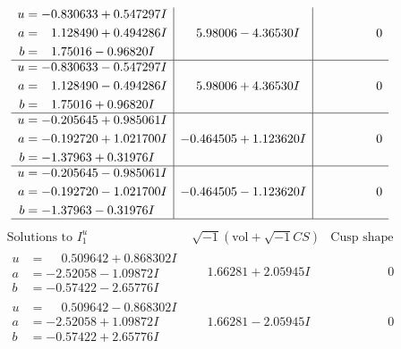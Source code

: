 \documentclass[1p]{elsarticle_modified}
\theoremstyle{definition}
\newcommand{\I}{\sqrt{-1}}
\begin{document}
$$\begin{array}{c|c|c}
\begin{aligned}
u &= -0.830633 + 0.547297 I \\
a &= \phantom{-}1.128490 + 0.494286 I \\
b &= \phantom{-}1.75016 - 0.96820 I\end{aligned}
 & \phantom{-}5.98006 - 4.36530 I & \phantom{-0.000000 } 0 \\ \hline\begin{aligned}
u &= -0.830633 - 0.547297 I \\
a &= \phantom{-}1.128490 - 0.494286 I \\
b &= \phantom{-}1.75016 + 0.96820 I\end{aligned}
 & \phantom{-}5.98006 + 4.36530 I & \phantom{-0.000000 } 0 \\ \hline\begin{aligned}
u &= -0.205645 + 0.985061 I \\
a &= -0.192720 + 1.021700 I \\
b &= -1.37963 + 0.31976 I\end{aligned}
 & -0.464505 + 1.123620 I & \phantom{-0.000000 } 0 \\ \hline\begin{aligned}
u &= -0.205645 - 0.985061 I \\
a &= -0.192720 - 1.021700 I \\
b &= -1.37963 - 0.31976 I\end{aligned}
 & -0.464505 - 1.123620 I & \phantom{-0.000000 } 0\\
 \hline 
 \end{array}$$\newpage$$\begin{array}{c|c|c}  
\text{Solutions to }I^u_{1}& \I (\text{vol} + \sqrt{-1}CS) & \text{Cusp shape}\\
 \hline 
\begin{aligned}
u &= \phantom{-}0.509642 + 0.868302 I \\
a &= -2.52058 - 1.09872 I \\
b &= -0.57422 - 2.65776 I\end{aligned}
 & \phantom{-}1.66281 + 2.05945 I & \phantom{-0.000000 } 0 \\ \hline\begin{aligned}
u &= \phantom{-}0.509642 - 0.868302 I \\
a &= -2.52058 + 1.09872 I \\
b &= -0.57422 + 2.65776 I\end{aligned}
 & \phantom{-}1.66281 - 2.05945 I & \phantom{-0.000000 } 0 \\ \hline\begin{aligned}

\end{aligned}
\end{array}$$
\end{document}
